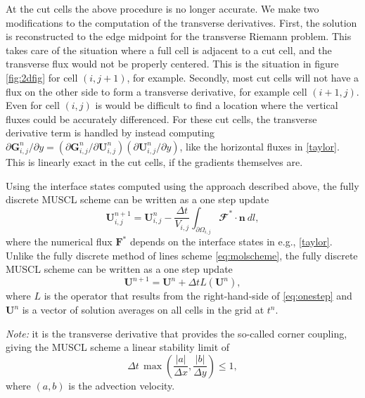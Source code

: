 At the cut cells the above procedure is no longer accurate.   We make two modifications to the
computation of the transverse derivatives. First,
the solution is reconstructed to the edge midpoint  for the transverse Riemann problem.
This takes care of the situation where a full cell is adjacent to a cut cell, and
the transverse flux would not be properly centered. This is the situation
in figure \ref{fig:2dfig} for cell $(i,j+1)$, for example.
Secondly, most cut cells will not have a flux on the other side to form a
transverse derivative, for example cell $(i+1,j)$. Even for cell $(i,j)$ is would
be difficult to find a location where the vertical fluxes could be accurately differenced.
For these cut cells, the transverse derivative term is handled by instead computing
$ \partial \mathbf{G}_{i,j}^n / \partial y = ( \partial \mathbf{G}_{i,j}^n / \partial \mathbf{U}_{i,j}^n)( \partial \mathbf{U}_{i,j}^n / \partial y)$,
like the horizontal fluxes in \eqref{taylor}. This is linearly exact in the cut cells, 
if the gradients themselves are.



Using the interface states computed using the approach described above, the fully discrete MUSCL scheme can be written as a one step update
\begin{equation}\label{eq:onestep}
\mathbf{U}_{i,j}^{n+1} = \mathbf{U}^n_{i,j} - \frac{\Delta t}{V_{i,j}} \int_{\partial \Omega_{i,j}} \mathbfcal{F}^* \cdot \mathbf{n}~dl,
\end{equation}
where 
the numerical flux $\mathbf{F}^*$ depends on the interface states in e.g., \eqref{taylor}.
Unlike the fully discrete method of lines scheme \eqref{eq:molscheme}, the fully discrete MUSCL scheme can be written as a one step update
\begin{equation}\label{eq:musclscheme}
\mathbf{U}^{n+1} = \mathbf{U}^{n} + \Delta t L(\mathbf{U}^{n}),
\end{equation}
where $L$ is the operator that results from the right-hand-side of \eqref{eq:onestep} and $\mathbf{U}^{n}$ is a vector of solution averages on all cells in the grid at $t^n$.


\textit{Note:} it is the transverse derivative that provides the so-called corner coupling, giving the MUSCL scheme a linear stability limit of
\begin{equation}
\label{eqn:bigcfllimit}
\Delta t \, \max \left (\frac{|a|}{\Delta x} , \frac{|b|}{\Delta y} \right) \leq 1,
\end{equation}
where $(a,b)$ is the advection velocity.  


